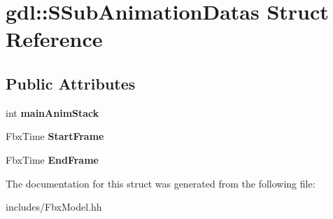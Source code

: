 \hypertarget{structgdl_1_1_s_sub_animation_datas}{\section{gdl\-:\-:S\-Sub\-Animation\-Datas Struct Reference}
\label{structgdl_1_1_s_sub_animation_datas}
}
\subsection*{Public Attributes}
\begin{DoxyCompactItemize}
\item 
\hypertarget{structgdl_1_1_s_sub_animation_datas_a4109ddf9701a2634c9c9c12e93638b74}{int {\bfseries main\-Anim\-Stack}}\label{structgdl_1_1_s_sub_animation_datas_a4109ddf9701a2634c9c9c12e93638b74}

\item 
\hypertarget{structgdl_1_1_s_sub_animation_datas_a34441ebc14fd9a428bdd58fa816c82c9}{Fbx\-Time {\bfseries Start\-Frame}}\label{structgdl_1_1_s_sub_animation_datas_a34441ebc14fd9a428bdd58fa816c82c9}

\item 
\hypertarget{structgdl_1_1_s_sub_animation_datas_af979cadaa7adb6995eda795f2f851034}{Fbx\-Time {\bfseries End\-Frame}}\label{structgdl_1_1_s_sub_animation_datas_af979cadaa7adb6995eda795f2f851034}

\end{DoxyCompactItemize}


The documentation for this struct was generated from the following file\-:\begin{DoxyCompactItemize}
\item 
includes/Fbx\-Model.\-hh\end{DoxyCompactItemize}
